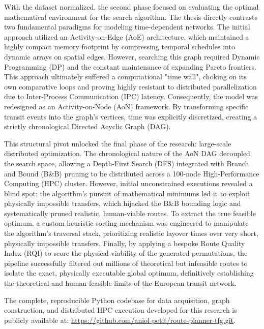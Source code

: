 \medskip

With the dataset normalized, the second phase focused on evaluating the optimal mathematical environment for the search algorithm. The thesis directly contrasts two fundamental paradigms for modeling time-dependent networks. The initial approach utilized an Activity-on-Edge (AoE) architecture, which maintained a highly compact memory footprint by compressing temporal schedules into dynamic arrays on spatial edges. However, searching this graph required Dynamic Programming (DP) and the constant maintenance of expanding Pareto frontiers. This approach ultimately suffered a computational "time wall", choking on its own comparative loops and proving highly resistant to distributed parallelization due to Inter-Process Communication (IPC) latency. Consequently, the model was redesigned as an Activity-on-Node (AoN) framework. By transforming specific transit events into the graph's vertices, time was explicitly discretized, creating a strictly chronological Directed Acyclic Graph (DAG).

\medskip

This structural pivot unlocked the final phase of the research: large-scale distributed optimization. The chronological nature of the AoN DAG decoupled the search space, allowing a Depth-First Search (DFS) integrated with Branch and Bound (B\&B) pruning to be distributed across a 100-node High-Performance Computing (HPC) cluster. However, initial unconstrained executions revealed a blind spot: the algorithm's pursuit of mathematical minimums led it to exploit physically impossible transfers, which hijacked the B\&B bounding logic and systematically pruned realistic, human-viable routes. To extract the true feasible optimum, a custom heuristic sorting mechanism was engineered to manipulate the algorithm's traversal stack, prioritizing realistic layover times over very short, physically impossible transfers. Finally, by applying a bespoke Route Quality Index (RQI) to score the physical viability of the generated permutations, the pipeline successfully filtered out millions of theoretical but infeasible routes to isolate the exact, physically executable global optimum, definitively establishing the theoretical and human-feasible limits of the European transit network.

The complete, reproducible Python codebase for data acquisition, graph construction, and distributed HPC execution developed for this research is publicly available at: \url{https://github.com/aniol-petit/route-planner-tfg.git}.